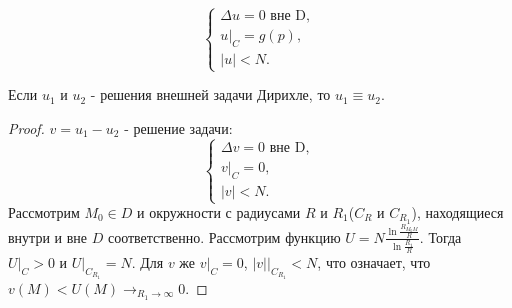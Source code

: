 \documentclass[11pt]{article}
\newcounter{th}\setcounter{th}{0}
\def\th{\par\smallskip\refstepcounter{th}\textbf{\arabic{th}}}
\newtheorem*{Theorem}{Теорема \th}
\begin{document}
\begin{enumerate}
\begin{equation}
\begin{cases}
\Delta u = 0 \text{ вне D}, \\
u|_{C} = g(p), \\
|u| < N.
\end{cases}
\end{equation}
\begin{Theorem}
Если $u_1$ и $u_2$ - решения внешней задачи Дирихле, то $u_1 \equiv u_2$.
\begin{proof}
$v = u_1 - u_2$ - решение задачи:
\begin{equation}
\begin{cases}
\Delta v = 0 \text{ вне D}, \\
v|_C = 0, \\
|v| < N.
\end{cases}
\end{equation}
Рассмотрим $M_0 \in D$ и окружности с радиусами $R$ и $R_1$($C_R$ и $C_{R_1}$), находящиеся внутри и вне $D$
соответственно. Рассмотрим функцию $U = N\frac{\ln\frac{R_{M_0M}}R}{\ln\frac{R_1}R}$. Тогда
$U|_{C} > 0$ и $U|_{C_{R_1}} = N$. Для $v$ же $v|_{C} = 0$, $|v||_{C_{R_1}} < N$, что означает, что
$v(M) < U(M) \to_{R_1 \to \infty} 0$.
\end{proof}
\end{Theorem}
\end{enumerate}
\end{document}
